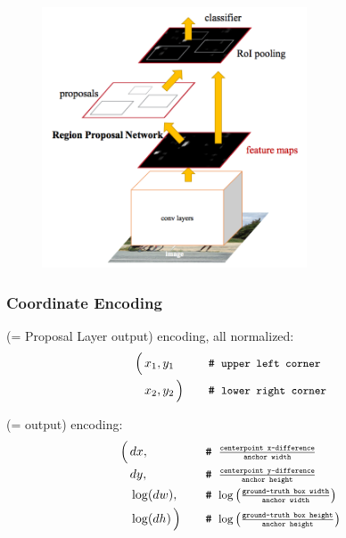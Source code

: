 \begin{frame}
  \begin{figure}
    \centering
    \includegraphics[width=0.7\textwidth]{rpn_in_network}
  \end{figure}
\end{frame}

\begin{frame}[t]
  \frametitle{Coordinate Encoding}
  \begin{description}[<only@+>]
  \item[Box coordinate] (= Proposal Layer output) encoding, all normalized:
  \begin{alignat*}{2}
    \Big(\,
    & x_1,y_1
    &&\text{\ttfamily\# \small upper left corner}\\
    &x_2,y_2\,\Big)\quad
    &&\text{\ttfamily\# \small lower right corner}
  \end{alignat*}
  \item[Coordinate correction] (=\reg{} output) encoding:
    \begin{alignat*}{2}
      \Big(\,
      &dx,
      &&\text{\ttfamily\# \small $\textstyle\frac
        {\text{centerpoint x-difference}}
        {\text{anchor width}}$}\\
      &dy,
      &&\text{\ttfamily\# \small $\textstyle\frac
        {\text{centerpoint y-difference}}
        {\text{anchor height}}$}\\
      &\log(dw),
      &&\text{\ttfamily\# \small $\log\left(\textstyle\frac
        {\text{ground-truth box width}}
        {\text{anchor width}}\right)$}\\
      &\log(dh)\,\Big)\quad
      &&\text{\ttfamily\# \small $\log\left(\textstyle\frac
         {\text{ground-truth box height}}
         {\text{anchor height}}\right)$}
    \end{alignat*}
  \end{description}
\end{frame}

